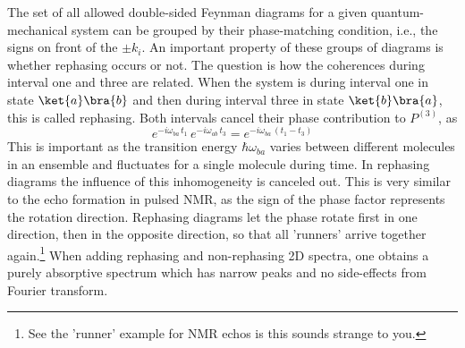 The set of all allowed double-sided Feynman diagrams for a given quantum-mechanical system can be grouped by their phase-matching condition, i.e., the signs on front of the $\pm k_i$. An important property of these groups of diagrams is whether rephasing occurs or not. The question is how the coherences during interval one and three are related. When the system is during interval one in state $\ket{a}\bra{b}$  and then during interval three in state $\ket{b}\bra{a}$, this is called rephasing. Both intervals cancel their phase contribution to $P^{(3)}$, as
\begin{equation}
  e^{- i \omega_{ba} \, t_1} \,   e^{- i \omega_{ab} \, t_3} =   e^{- i  \omega_{ba} \, ( t_1 - t_3)}
\end{equation}
This is important as the transition energy $\hbar \omega_{ba}$ varies between different molecules in an ensemble and fluctuates for a single molecule during time. In rephasing diagrams the influence of this inhomogeneity is canceled out. This is very similar to the echo formation in pulsed NMR, as the sign of the phase factor represents the rotation direction. Rephasing diagrams let the phase rotate first in one direction, then in the opposite direction, so that all 'runners' arrive together again.\footnote{See the 'runner' example for NMR echos is this sounds strange to you.} When adding rephasing and non-rephasing 2D spectra, one obtains a purely absorptive spectrum which has narrow peaks and no side-effects from Fourier transform.



\printbibliography[segment=\therefsegment,heading=subbibliography]
